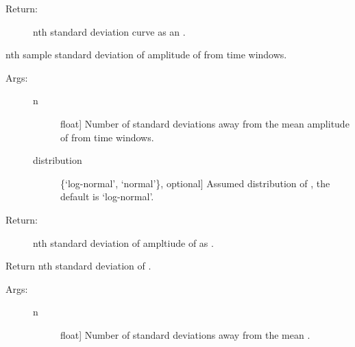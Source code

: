 \documentclass[letterpaper,10pt,english,openany,oneside]{sphinxmanual}
\begin{document}
\begin{fulllineitems}
\begin{fulllineitems}
\begin{description}
\item[{Return:}] \leavevmode
nth standard deviation curve as an .

\end{description}

\end{fulllineitems}


\begin{fulllineitems}
\label{\detokenize{index:hvsrpy.Hvsr.nstd_f0_amp}}
nth sample standard deviation of amplitude of  from time
windows.
\begin{description}
\item[{Args:}] \leavevmode\begin{description}
\item[{n}] \leavevmode{[}float{]}
Number of standard deviations away from the mean
amplitude of  from time windows.

\item[{distribution}] \leavevmode{[}\{‘log-normal’, ‘normal’\}, optional{]}
Assumed distribution of , the default is
‘log-normal’.

\end{description}

\item[{Return:}] \leavevmode
nth standard deviation of ampltiude of  as .

\end{description}

\end{fulllineitems}


\begin{fulllineitems}
\label{\detokenize{index:hvsrpy.Hvsr.nstd_f0_frq}}
Return nth standard deviation of .
\begin{description}
\item[{Args:}] \leavevmode\begin{description}
\item[{n}] \leavevmode{[}float{]}
Number of standard deviations away from the mean .


\end{description}
\end{description}
\end{fulllineitems}
\end{fulllineitems}
\end{document}
